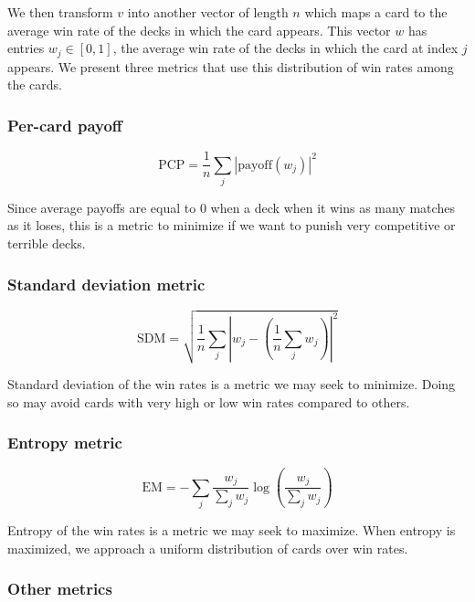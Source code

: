 We then transform $v$ into another vector of length $n$ which maps a card to the
average win rate of the decks in which the card appears. This
vector $w$ has entries
$w_j \in [0, 1]$, the average win rate of the decks in which
the card at index $j$ appears. We present three metrics that 
use this distribution of win rates among the cards.


\subsubsection{Per-card payoff}

\begin{equation}
	\mathrm{PCP} = \frac{1}{n} \sum_j \left|\mathrm{payoff}(w_j)\right|^2
\end{equation}

Since average payoffs are equal to 0 when a deck when it wins as many matches as it loses, this is a metric to 
minimize if we want to punish very competitive or terrible decks.

\subsubsection{Standard deviation metric}

\begin{equation}
	\mathrm{SDM} = \sqrt{\frac{1}{n} \sum_j \left|w_j - \left(\frac{1}{n}\sum_j w_j\right)\right|^2}
\end{equation}

Standard deviation of the win rates is a metric we may seek to minimize. Doing so may avoid cards with
very high or low win rates compared to others.

\subsubsection{Entropy metric}

\begin{equation}
	\mathrm{EM} = -\sum_j \frac{w_j}{\sum_j w_j} \log\left(\frac{w_j}{\sum_j w_j}\right)
\end{equation}

Entropy of the win rates is a metric we may seek to maximize. When entropy is maximized, we approach a uniform
distribution of cards over win rates.

\subsubsection{Other metrics}

